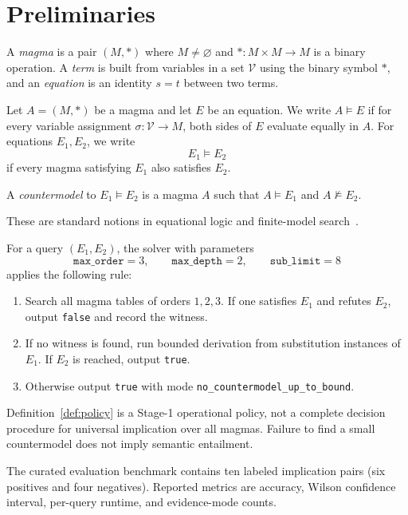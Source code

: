 \section{Preliminaries}

\begin{definition}\label{def:magma-term}
A \emph{magma} is a pair $(M,\ast)$ where $M\neq\varnothing$ and $\ast\colon M\times M\to M$ is a binary operation. A \emph{term} is built from variables in a set $\mathcal V$ using the binary symbol $\ast$, and an \emph{equation} is an identity $s=t$ between two terms.
\end{definition}

\begin{definition}\label{def:satisfaction}
Let $A=(M,\ast)$ be a magma and let $E$ be an equation. We write $A\models E$ if for every variable assignment $\sigma\colon\mathcal V\to M$, both sides of $E$ evaluate equally in $A$. For equations $E_1,E_2$, we write
\[
E_1\models E_2
\]
if every magma satisfying $E_1$ also satisfies $E_2$.
\end{definition}

\begin{definition}[Countermodel]\label{def:countermodel}
A \emph{countermodel} to $E_1\models E_2$ is a magma $A$ such that $A\models E_1$ and $A\not\models E_2$.
\end{definition}

These are standard notions in equational logic and finite-model search~\cite{mccune2003mace4,bolan2025etp}.

\begin{definition}\label{def:policy}
For a query $(E_1,E_2)$, the solver with parameters
\[
\texttt{max\_order}=3,\qquad \texttt{max\_depth}=2,\qquad \texttt{sub\_limit}=8
\]
applies the following rule:
\begin{enumerate}[leftmargin=*]
\item Search all magma tables of orders $1,2,3$. If one satisfies $E_1$ and refutes $E_2$, output \texttt{false} and record the witness.
\item If no witness is found, run bounded derivation from substitution instances of $E_1$. If $E_2$ is reached, output \texttt{true}.
\item Otherwise output \texttt{true} with mode \texttt{no\_countermodel\_up\_to\_bound}.
\end{enumerate}
\end{definition}

\begin{remark}\label{rem:scope}
Definition~\ref{def:policy} is a Stage-1 operational policy, not a complete decision procedure for universal implication over all magmas. Failure to find a small countermodel does not imply semantic entailment.
\end{remark}

The curated evaluation benchmark contains ten labeled implication pairs (six positives and four negatives). Reported metrics are accuracy, Wilson confidence interval, per-query runtime, and evidence-mode counts.
